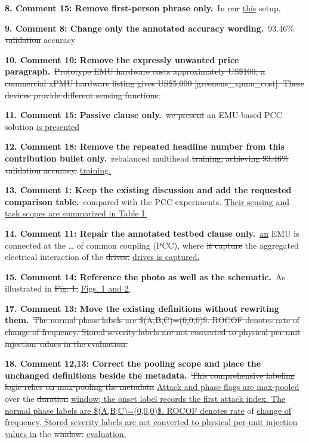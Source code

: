 \documentclass[10pt,letterpaper]{article}
\newcommand{\added}[1]{{\color{blue}\uline{#1}}}
\newcommand{\removed}[1]{{\color{red}\sout{#1}}}
\begin{document}
\textbf{8. Comment 15: Remove first-person phrase only.}\
In \removed{our} \added{this} setup,\par
\textbf{9. Comment 8: Change only the annotated accuracy wording.}\
93.46\% \removed{validation} accuracy\par
\textbf{10. Comment 10: Remove the expressly unwanted price paragraph.}\
\removed{Prototype EMU hardware costs approximately US\$100; a commercial xPMU hardware listing gives US\$5,000 [greenens\_xpmu\_cost]. These devices provide different sensing functions.}\par
\textbf{11. Comment 15: Passive clause only.}\
\removed{we present} an EMU-based PCC solution \added{is presented}\par
\textbf{12. Comment 18: Remove the repeated headline number from this contribution bullet only.}\
rebalanced multihead \removed{training, achieving 93.46\% validation accuracy.} \added{training.}\par
\textbf{13. Comment 1: Keep the existing discussion and add the requested comparison table.}\
compared with the PCC experiments. \added{Their sensing and task scopes are summarized in Table I.}\par
\textbf{14. Comment 11: Repair the annotated testbed clause only.}\
\added{an} EMU is connected at the \ldots{} of common coupling (PCC), where \removed{it capture} the aggregated electrical interaction of the \removed{drives.} \added{drives is captured.}\par
\textbf{15. Comment 14: Reference the photo as well as the schematic.}\
As illustrated in \removed{Fig. 1,} \added{Figs. 1 and 2,}\par
\textbf{17. Comment 13: Move the existing definitions without rewriting them.}\
\removed{The normal phase labels are \$(A,B,C)=(0,0,0)\$. ROCOF denotes rate of change of frequency. Stored severity labels are not converted to physical per-unit injection values in the evaluation.}\par
\textbf{18. Comment 12,13: Correct the pooling scope and place the unchanged definitions beside the metadata.}\
\removed{This comprehensive labeling logic relies on max-pooling the metadata} \added{Attack and phase flags are max-pooled} over the \removed{duration} \added{window; the onset label records the first attack index. The normal phase labels are \$(A,B,C)=(0,0,0)\$. ROCOF denotes rate} of \added{change of frequency. Stored severity labels are not converted to physical per-unit injection values in} the \removed{window.} \added{evaluation.}\par
\end{document}
